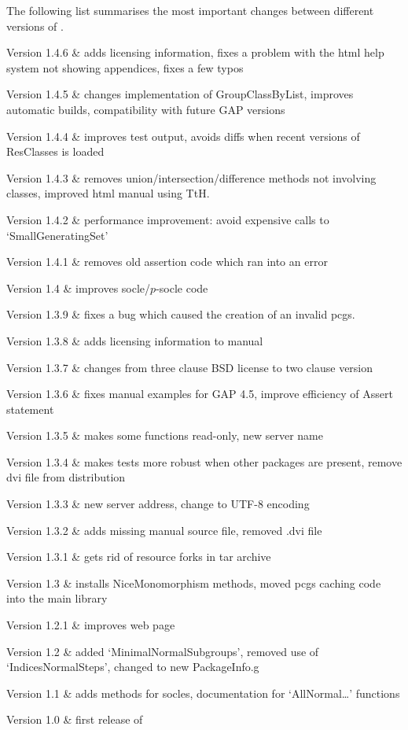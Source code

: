 
The following list summarises the most important changes between different versions of \CRISP.

\beginitems
Version 1.4.6 &
	adds licensing information, fixes a problem with the html help system not showing appendices, fixes a few typos
	
Version 1.4.5 &
	changes implementation of GroupClassByList, improves automatic builds, compatibility with future GAP versions
	
Version  1.4.4 &
	improves test output, avoids diffs when recent versions of ResClasses is loaded

Version 1.4.3 &
	removes union/intersection/difference methods not involving classes, improved html manual using TtH.

Version 1.4.2 & 
	performance improvement: avoid expensive calls to `SmallGeneratingSet'
	
Version 1.4.1 &
	removes old assertion code which ran into an error
	
Version 1.4 &
	improves socle/$p$-socle code
	
Version 1.3.9 &
	fixes a bug which caused the creation of an invalid pcgs.
	
Version 1.3.8 &
	adds licensing information to manual
	
Version 1.3.7 &
	changes from three clause BSD license to two clause version
	
Version 1.3.6 & 
	fixes manual examples for GAP 4.5, improve efficiency of Assert statement
	
Version 1.3.5 &
	makes some functions read-only, new server name
	
Version 1.3.4 & 
	makes tests more robust when other packages are present, remove dvi file from distribution
	
Version 1.3.3 &	
	new server address, change to UTF-8 encoding
	
Version 1.3.2 &
	adds missing manual source file, removed .dvi file
	
Version 1.3.1 & 
	gets rid of resource forks in tar archive
	
Version 1.3	&
	installs NiceMonomorphism methods, moved pcgs caching code into the main {\GAP} library
	
Version 1.2.1	&
	improves web page
	
Version 1.2	&
	added `MinimalNormalSubgroups', removed use of `IndicesNormalSteps', changed to new PackageInfo.g 

Version 1.1 	& 
	adds methods for socles, documentation for `AllNormal\dots' functions
	
Version 1.0	&
	first release of {\CRISP}
	
\enditems

